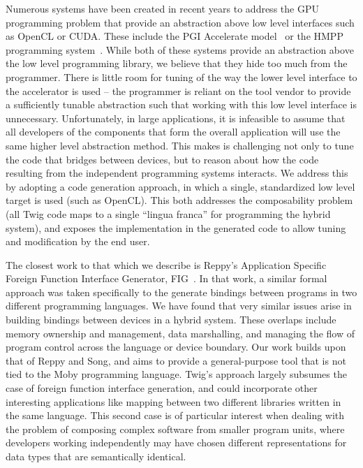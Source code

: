 Numerous systems have been created in recent years to address the GPU
programming problem that provide an abstraction above low level interfaces such
as OpenCL or CUDA. These include the PGI Accelerate model~\cite{pgi-accelerate}
or the HMPP programming system~\cite{hmpp}. While both of these systems provide
an abstraction above the low level programming library, we believe that they
hide too much from the programmer. There is little room for tuning of the way
the lower level interface to the accelerator is used -- the programmer is
reliant on the tool vendor to provide a sufficiently tunable abstraction such
that working with this low level interface is unnecessary. Unfortunately, in
large applications, it is infeasible to assume that all developers of the
components that form the overall application will use the same higher level
abstraction method. This makes is challenging not only to tune the code that
bridges between devices, but to reason about how the code resulting from the
independent programming systems interacts. We address this by adopting a code
generation approach, in which a single, standardized low level target is used
(such as OpenCL). This both addresses the composability problem (all Twig code
maps to a single ``lingua franca'' for programming the hybrid system), and
exposes the implementation in the generated code to allow tuning and
modification by the end user.

The closest work to that which we describe is Reppy's Application Specific
Foreign Function Interface Generator, FIG~\cite{reppy06fig}. In that work, a
similar formal approach was taken specifically to the generate bindings between
programs in two different programming languages. We have found that very similar
issues arise in building bindings between devices in a hybrid system. These
overlaps include memory ownership and management, data marshalling, and managing
the flow of program control across the language or device boundary. Our work
builds upon that of Reppy and Song, and aims to provide a general-purpose tool
that is not tied to the Moby programming language. Twig's approach largely
subsumes the case of foreign function interface generation, and could
incorporate other interesting applications like mapping between two different
libraries written in the same language. This second case is of particular
interest when dealing with the problem of composing complex software from
smaller program units, where developers working independently may have chosen
different representations for data types that are semantically identical.

